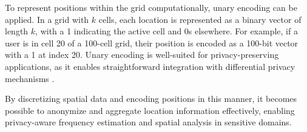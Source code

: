 To represent positions within the grid computationally, unary encoding can be applied. In a grid with \( k \) cells, each location is represented as a binary vector of length \( k \), with a 1 indicating the active cell and 0s elsewhere. For example, if a user is in cell 20 of a 100-cell grid, their position is encoded as a 100-bit vector with a 1 at index 20. Unary encoding is well-suited for privacy-preserving applications, as it enables straightforward integration with differential privacy mechanisms \cite{yang2023local}.

By discretizing spatial data and encoding positions in this manner, it becomes possible to anonymize and aggregate location information effectively, enabling privacy-aware frequency estimation and spatial analysis in sensitive domains.



